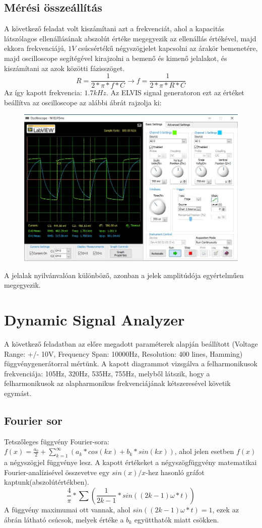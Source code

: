 \documentclass[10pt, conference,a4paper]{ITKproc}
\begin{document}
\subsection{Mérési összeállítás}
A következő feladat volt kiszámítani azt a frekvenciát, ahol a kapacitás látszólagos ellenállásának abszolút értéke megegyezik az ellenállás értékével, majd ekkora frekvenciájú, $1V$ csúcsértékű négyszögjelet kapcsolni az árakör bemenetére, majd oscilloscope segítégével kirajzolni a bemenő és kimenő jelalakot, és kiszámítani az azok közötti fázisszöget. \[R = \frac{1}{2*\pi * f*C} \to f = \frac{1}{2*\pi *R*C}\]
Az így kapott frekvencia: $1.7 kHz$.
Az ELVIS signal generatoron ezt az értéket beállítva az oscilloscope az alábbi ábrát rajzolja ki:
\begin{figure}[h]
\includegraphics[scale=0.3]{oscil_2}
\centering
\end{figure}
A jelalak nyilvánvalóan különböző, azonban a jelek amplitúdója egyértelműen megegyezik. 

\section{Dynamic Signal Analyzer}
A következő feladatban az előre megadott paraméterek alapján beállított (Voltage Range: +/- 10V, Frequency Span: 10000Hz, Resolution: 400 lines, Hamming) függvénygenerátorral mértünk. A kapott diagrammot vizsgálva a felharmonikusok frekvenciája: 105Hz, 320Hz, 535Hz, 755Hz, melyből látszik, hogy a felharmonikusok az alapharmonikus frekvenciájának kétszeresével követik egymást. 
\subsection{Fourier sor}
Tetszőleges függvény Fourier-sora: $f(x) = \frac{a_0}{2} + \sum_{k=1}^{\infty} (a_k*cos(kx)+b_k*sin(kx))$, ahol jelen esetben $f(x)$ a négyszögjel függvénye lesz. 
A kapott értékeket a négyszögfüggvény matematikai Fourier-analízisével összevetve egy $sin(x)/x$-hez hasonló gráfot kaptunk(abszolútértékben). 
\[\frac{4}{\pi} * \sum(\frac{1}{2k-1}*sin((2k-1)\omega *t))\]
A függvény maximumai ott vannak, ahol $sin((2k-1)\omega *t) = 1$, ezek az ábrán látható csúcsok, melyek értéke a $b_k$ együtthatók miatt csökken. 
\end{document}
